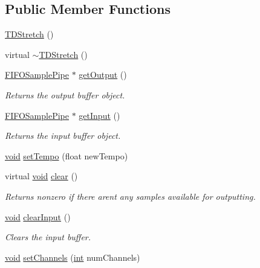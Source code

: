 \subsection*{Public Member Functions}
\begin{DoxyCompactItemize}
\item 
\hyperlink{classsoundtouch_1_1_t_d_stretch_a385b25e91ec29b1091092383268576b9}{T\+D\+Stretch} ()
\item 
virtual \hyperlink{classsoundtouch_1_1_t_d_stretch_a87b72187ccaa195538fbb3ecebe69b9d}{$\sim$\+T\+D\+Stretch} ()
\item 
\hyperlink{classsoundtouch_1_1_f_i_f_o_sample_pipe}{F\+I\+F\+O\+Sample\+Pipe} $\ast$ \hyperlink{classsoundtouch_1_1_t_d_stretch_a7f463d6b1e62bcf4e856bed936d54c0d}{get\+Output} ()
\begin{DoxyCompactList}\small\item\em Returns the output buffer object. \end{DoxyCompactList}\item 
\hyperlink{classsoundtouch_1_1_f_i_f_o_sample_pipe}{F\+I\+F\+O\+Sample\+Pipe} $\ast$ \hyperlink{classsoundtouch_1_1_t_d_stretch_ad877ccd929e7bf963073779176bfb82f}{get\+Input} ()
\begin{DoxyCompactList}\small\item\em Returns the input buffer object. \end{DoxyCompactList}\item 
\hyperlink{sound_8c_ae35f5844602719cf66324f4de2a658b3}{void} \hyperlink{classsoundtouch_1_1_t_d_stretch_a8f8439cea0bad6c675f74d05398a0346}{set\+Tempo} (float new\+Tempo)
\item 
virtual \hyperlink{sound_8c_ae35f5844602719cf66324f4de2a658b3}{void} \hyperlink{classsoundtouch_1_1_t_d_stretch_afd5f24f010fea81989f65f4011b4e284}{clear} ()
\begin{DoxyCompactList}\small\item\em Returns nonzero if there aren\textquotesingle{}t any samples available for outputting. \end{DoxyCompactList}\item 
\hyperlink{sound_8c_ae35f5844602719cf66324f4de2a658b3}{void} \hyperlink{classsoundtouch_1_1_t_d_stretch_a98b24712eff48780ef4c74409d6bfcdf}{clear\+Input} ()
\begin{DoxyCompactList}\small\item\em Clears the input buffer. \end{DoxyCompactList}\item 
\hyperlink{sound_8c_ae35f5844602719cf66324f4de2a658b3}{void} \hyperlink{classsoundtouch_1_1_t_d_stretch_a91016a1d252028131b70de4d7d82a076}{set\+Channels} (\hyperlink{xmltok_8h_a5a0d4a5641ce434f1d23533f2b2e6653}{int} num\+Channels)

\end{DoxyCompactItemize}
